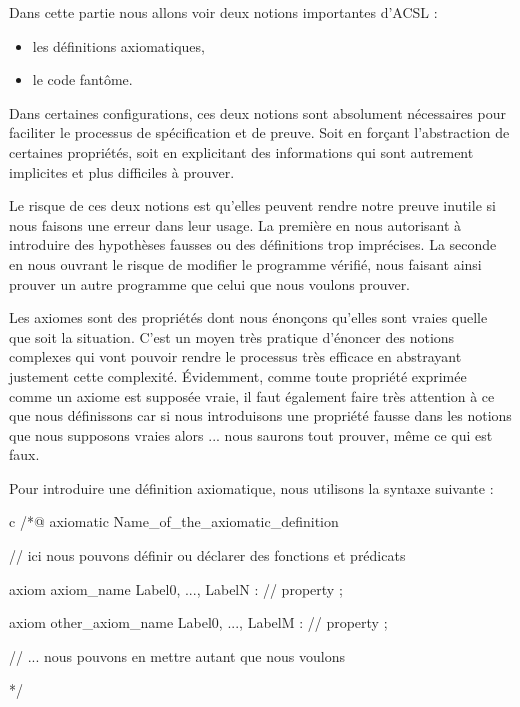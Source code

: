 \documentclass[middle]{zmdocument}
\begin{document}


Dans cette partie nous allons voir deux notions importantes d'ACSL :



\begin{itemize}
\item les définitions axiomatiques,
\item le code fantôme.
\end{itemize}


Dans certaines configurations, ces deux notions sont absolument nécessaires pour
faciliter le processus de spécification et de preuve. Soit en forçant 
l'abstraction de certaines propriétés, soit en explicitant des informations qui
sont autrement implicites et plus difficiles à prouver.



Le risque de ces deux notions est qu'elles peuvent rendre notre preuve inutile si
nous faisons une erreur dans leur usage. La première en nous autorisant à 
introduire des hypothèses fausses ou des définitions trop imprécises. La seconde
en nous ouvrant le risque de modifier le programme vérifié, nous faisant 
ainsi prouver un autre programme que celui que nous voulons prouver.





Les axiomes sont des propriétés dont nous énonçons qu'elles sont vraies quelle 
que soit la situation. C'est un moyen très pratique d'énoncer des notions 
complexes qui vont pouvoir rendre le processus très efficace en abstrayant 
justement cette complexité. Évidemment, comme toute propriété exprimée comme un
axiome est supposée vraie, il faut également faire très attention à ce que nous
définissons car si nous introduisons une propriété fausse dans les notions que 
nous supposons vraies alors ... nous saurons tout prouver, même ce qui est faux.





Pour introduire une définition axiomatique, nous utilisons la syntaxe suivante :



\begin{CodeBlock}{c}
/*@
  axiomatic Name_of_the_axiomatic_definition {
    // ici nous pouvons définir ou déclarer des fonctions et prédicats

    axiom axiom_name { Label0, ..., LabelN }:
      // property ;

    axiom other_axiom_name { Label0, ..., LabelM }:
      // property ;

    // ... nous pouvons en mettre autant que nous voulons
  }
*/
\end{CodeBlock}
\end{document}
